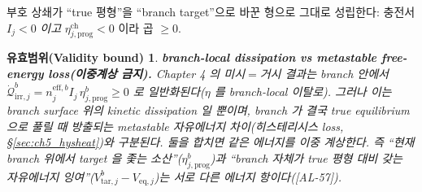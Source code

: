 \documentclass[11pt,a4paper]{article}
\newtheorem*{boundbox}{유효범위(Validity bound)}
\newcommand{\eff}{\mathrm{eff}}
\newcommand{\eq}{\mathrm{eq}}
\newcommand{\irr}{\mathrm{irr}}
\newcommand{\prog}{\mathrm{prog}}
\newcommand{\chg}{\mathrm{ch}}
\newcommand{\tar}{\mathrm{tar}}
\newcommand{\AL}[1]{\textsf{[AL-#1]}}
\begin{document}
부호 상쇄가 ``true 평형''을 ``branch target''으로 바꾼 형으로 그대로 성립한다: 충전서 $I_j<0$ \emph{이고}
$\eta_{j,\prog}^\chg<0$ 이라 곱 $\ge0$.
\begin{boundbox}
\textbf{branch-local dissipation vs metastable free-energy loss(이중계상 금지).} Chapter 4 의 미시$=$거시
결과는 branch 안에서 $\dot{\mathcal Q}_{\irr,j}^b=n_j^{\eff,b}I_j\,\eta_{j,\prog}^b\ge0$ 로 일반화된다($\eta$ 를
branch-local 이탈로). 그러나 이는 \emph{branch surface 위의 kinetic dissipation} 일 뿐이며, branch 가 결국
true equilibrium 으로 풀릴 때 방출되는 \emph{metastable 자유에너지 차이}(히스테리시스 loss,
\S\ref{sec:ch5_hysheat})와 \emph{구분}된다. 둘을 합치면 같은 에너지를 이중 계상한다. 즉 ``현재 branch 위에서
target 을 좇는 소산''($\eta_{j,\prog}^b$)과 ``branch 자체가 true 평형 대비 갖는 자유에너지 잉여''($V_{\tar,j}^b
-V_{\eq,j}$)는 서로 다른 에너지 항이다(\AL{57}).
\end{boundbox}

\end{document}
